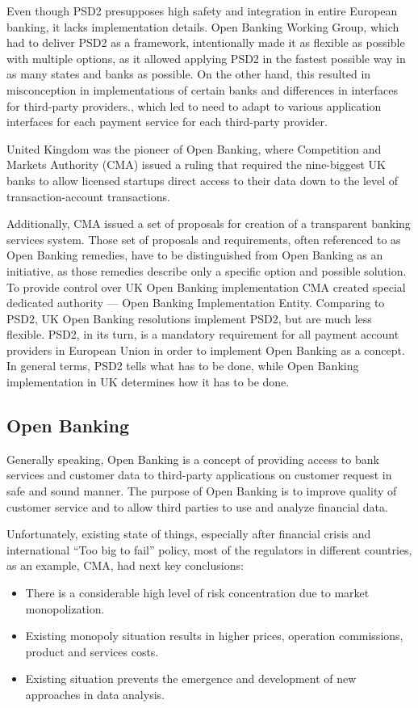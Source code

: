 Even though PSD2 presupposes high safety and integration in entire European banking, it lacks implementation details. 
Open Banking Working Group, which had to deliver PSD2 as a framework, intentionally made it as flexible as possible with multiple options, as it allowed applying PSD2 in the fastest possible way in as many states and banks as possible. 
On the other hand, this resulted in misconception in implementations of certain banks and differences in interfaces for third-party providers., which led to need to adapt to various application interfaces for each payment service for each third-party provider.

United Kingdom was the pioneer of Open Banking, where Competition and Markets Authority (CMA) issued a ruling that required the nine-biggest UK banks to allow licensed startups direct access to their data down to the level of transaction-account transactions. 
\cite{open_banking_uk}

Additionally, CMA issued a set of proposals for creation of a transparent banking services system.
Those set of proposals and requirements, often referenced to as Open Banking remedies, have to be distinguished from Open Banking as an initiative, as those remedies describe only a specific option and possible solution.
To provide control over UK Open Banking implementation CMA created special dedicated authority — Open Banking Implementation Entity.
Comparing to PSD2, UK Open Banking resolutions implement PSD2, but are much less flexible.
PSD2, in its turn, is a mandatory requirement for all payment account providers in European Union in order to implement Open Banking as a concept. In general terms, PSD2 tells what has to be done, while Open Banking implementation in UK determines how it has to be done.




\subsection{Open Banking}

Generally speaking, Open Banking is a concept of providing access to bank services and customer data to third-party applications on customer request in safe and sound manner. 
\cite{deloitte_open_banking}
The purpose of Open Banking is to improve quality of customer service and to allow third parties to use and analyze financial data.

Unfortunately, existing state of things, especially after financial crisis and international “Too big to fail” policy, most of the regulators in different countries, as an example, CMA, had next key conclusions:
\cite{cma_banking_investigation}
\begin{itemize}
    \item There is a considerable high level of risk concentration due to market monopolization.
    \item Existing monopoly situation results in higher prices, operation commissions, product and services costs.
    \item Existing situation prevents the emergence and development of new approaches in data analysis.
\end{itemize}

